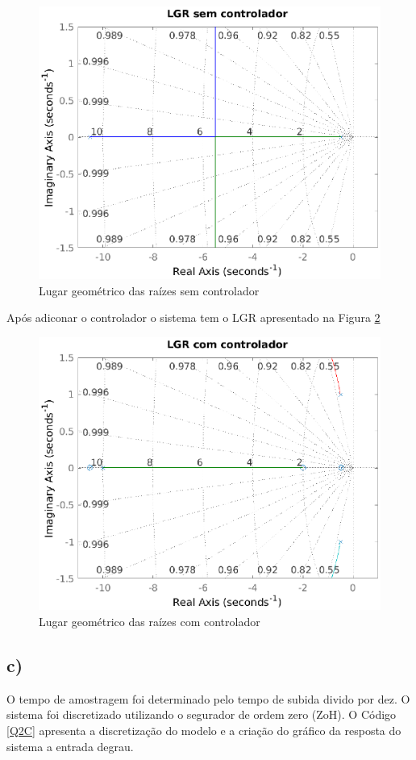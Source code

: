     \begin{figure}[!ht]
        \centering
        \includegraphics[width = 0.75\linewidth]{Figuras/ProblemasPI/Problema2/LGRsemcontrolador.eps}
        \caption{Lugar geométrico das raízes sem controlador}
        \label{fig:LGR2Bsem}                   
    \end{figure}

    Após adiconar o controlador o sistema tem o LGR apresentado na Figura \ref{fig:LGR2Bcom}
    
    \begin{figure}[!ht]
        \centering
        \includegraphics[width = 0.75\linewidth]{Figuras/ProblemasPI/Problema2/LGRcomcontrolador.eps}
        \caption{Lugar geométrico das raízes com controlador}
        \label{fig:LGR2Bcom}                   
    \end{figure}
\clearpage 
\newpage
 

\subsection*{c) }
    O tempo de amostragem foi determinado pelo tempo de subida divido por dez. 
    O sistema foi discretizado utilizando o segurador de ordem zero (ZoH). O Código \ref{Q2C} apresenta
    a discretização do modelo e a criação do gráfico da resposta do sistema a entrada degrau.
    

